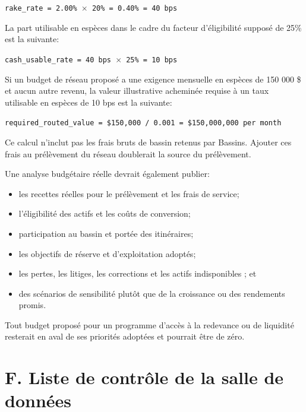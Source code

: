 \documentclass[11pt]{article}
\begin{document}
\texttt{rake\_rate = 2.00\% $\times$ 20\% = 0.40\% = 40 bps}

La part utilisable en espèces dans le cadre du facteur d'éligibilité supposé de 25\% est la suivante:

\texttt{cash\_usable\_rate = 40 bps $\times$ 25\% = 10 bps}

Si un budget de réseau proposé a une exigence mensuelle en espèces de 150 000 \$ et aucun autre revenu, la valeur illustrative acheminée requise à un taux utilisable en espèces de 10 bps est la suivante:

\texttt{required\_routed\_value = \$150,000 / 0.001 = \$150,000,000 per month}

Ce calcul n'inclut pas les frais bruts de bassin retenus par Bassins. Ajouter ces frais au prélèvement du réseau doublerait la source du prélèvement.

Une analyse budgétaire réelle devrait également publier:

\begin{itemize}[leftmargin=*]
\item les recettes réelles pour le prélèvement et les frais de service;
\item l'éligibilité des actifs et les coûts de conversion;
\item participation au bassin et portée des itinéraires;
\item les objectifs de réserve et d'exploitation adoptés;
\item les pertes, les litiges, les corrections et les actifs indisponibles ; et
\item des scénarios de sensibilité plutôt que de la croissance ou des rendements promis.
\end{itemize}
Tout budget proposé pour un programme d'accès à la redevance ou de liquidité resterait en aval de ses priorités adoptées et pourrait être de zéro.


\section*{F. Liste de contrôle de la salle de données}
\end{document}

